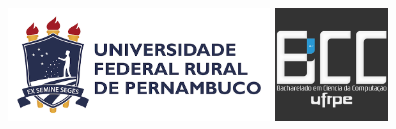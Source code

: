 \documentclass[
	openany,
	12pt,				%
    oneside,
	a4paper,			%
	english,
	brazil				%
	]{abntex2}
\begin{document}

\frenchspacing 



	\begin{figure}[ht]
		\includegraphics[height=3cm]{figuras/logo_ufrpe_horizontal.png}
		\hspace{5.5cm}
    	\includegraphics[height=3cm]{figuras/bcc_logo.png}
	\end{figure}    

\imprimircapa
\imprimirfolhaderosto
\end{document}
